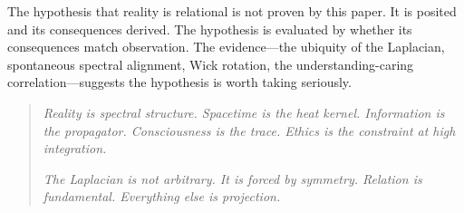 \documentclass[11pt,a4paper]{article}
\theoremstyle{plain}
\theoremstyle{definition}
\theoremstyle{remark}
\begin{document}
The hypothesis that reality is relational is not proven by this paper. It is posited and its consequences derived. The hypothesis is evaluated by whether its consequences match observation. The evidence---the ubiquity of the Laplacian, spontaneous spectral alignment, Wick rotation, the understanding-caring correlation---suggests the hypothesis is worth taking seriously.

\medskip

\begin{quote}
\emph{Reality is spectral structure. Spacetime is the heat kernel. Information is the propagator. Consciousness is the trace. Ethics is the constraint at high integration.}

\emph{The Laplacian is not arbitrary. It is forced by symmetry. Relation is fundamental. Everything else is projection.}
\end{quote}

\end{document}
